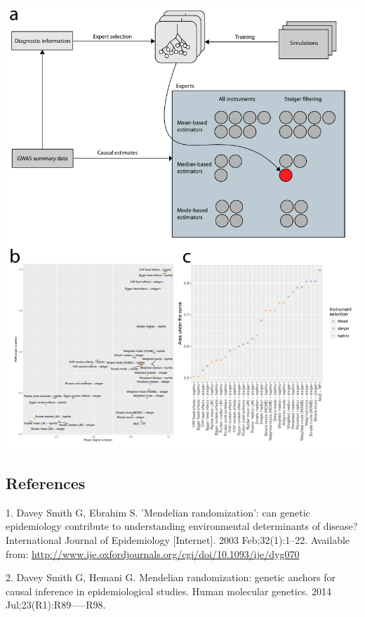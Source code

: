 \documentclass[]{article}
\begin{document}
\newpage

\includegraphics{images/fig2.pdf}

\subsection*{References}\label{references}

\hypertarget{refs}{}
\hypertarget{ref-DaveySmith2003}{}
1. Davey Smith G, Ebrahim S. 'Mendelian randomization': can genetic
epidemiology contribute to understanding environmental determinants of
disease? International Journal of Epidemiology {[}Internet{]}. 2003
Feb;32(1):1--22. Available from:
\url{http://www.ije.oxfordjournals.org/cgi/doi/10.1093/ije/dyg070}

\hypertarget{ref-DaveySmithHemani2014}{}
2. Davey Smith G, Hemani G. Mendelian randomization: genetic anchors for
causal inference in epidemiological studies. Human molecular genetics.
2014 Jul;23(R1):R89-----R98.
\end{document}
